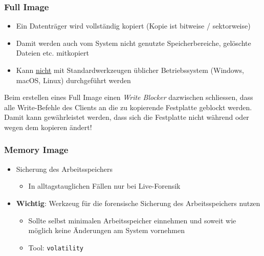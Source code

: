 \subsubsection{Full Image}
\begin{itemize}
    \item Ein Datenträger wird vollständig kopiert (Kopie ist bitweise / sektorweise)
    \item Damit werden auch vom System nicht genutzte Speicherbereiche, gelöschte Dateien etc. mitkopiert
    \item Kann \underline{nicht} mit Standardwerkzeugen üblicher Betriebssystem (Windows, macOS, Linux) durchgeführt werden
\end{itemize}

Beim erstellen eines Full Image einen \textit{Write Blocker} dazwischen schliessen, dass alle Write-Befehle des Clients an die zu kopierende Festplatte geblockt werden.
Damit kann gewährleistet werden, dass sich die Festplatte nicht während oder wegen dem kopieren ändert!

\subsubsection{Memory Image}
\begin{itemize}
    \item Sicherung des Arbeitsspeichers
    \begin{itemize}
        \item In alltagstauglichen Fällen nur bei Live-Forensik
    \end{itemize}
    \item \textbf{Wichtig}: Werkzeug für die forensische Sicherung des Arbeitsspeichers nutzen
    \begin{itemize}
        \item Sollte selbst minimalen Arbeitsspeicher einnehmen und soweit wie möglich keine Änderungen am System vornehmen
        \item  Tool: \lstinline|volatility|
    \end{itemize}
\end{itemize}

